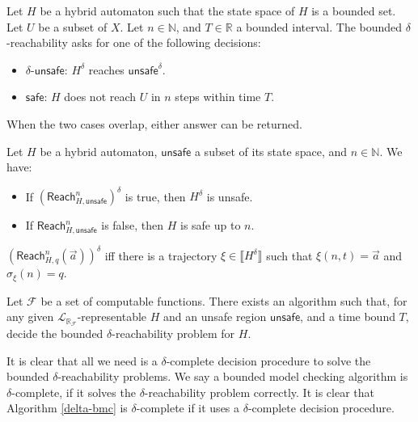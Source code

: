 \documentclass[envcountsect]{llncs}
\newcommand{\reach}{\mathsf{Reach}}
\newcommand{\unsafe}{\mathsf{unsafe}}
\newcommand{\safe}{\mathsf{safe}}
\newcommand{\lrf}{\mathcal{L}_{\mathbb{R}_{\mathcal{F}}}}
\begin{document}
\begin{definition}
Let $H$ be a hybrid automaton such that the state space of $H$ is a bounded
set. Let $U$ be a subset of $X$. Let $n\in \mathbb{N}$, and $T\in \mathbb{R}$ a
bounded interval. The bounded $\delta$-reachability asks for one of the
following decisions:
\begin{itemize}
\item $\delta$-$\unsafe$: $H^{\delta}$ reaches $\unsafe^{\delta}$.
\item $\safe$: $H$ does not reach $U$ in $n$ steps within time $T$.
\end{itemize}
When the two cases overlap, either answer can be returned.
\end{definition}

\begin{lemma}\label{bmclemma}
Let $H$ be a hybrid automaton, $\unsafe$ a subset of its state space, and
$n\in\mathbb{N}$. We have:
\begin{itemize}
\item If $(\reach^n_{H,\unsafe})^{\delta}$ is true, then $H^{\delta}$ is unsafe.
\item If $\reach^n_{H,\unsafe}$ is false, then $H$ is safe up to $n$.
\end{itemize}
\end{lemma}

\begin{proposition}\label{equiv-delta}
$(\reach_{H,q}^n(\vec a))^{\delta}$ iff there is a trajectory $\xi\in
\llbracket H^{\delta}\rrbracket$ such that $\xi(n, t) = \vec a$ and
$\sigma_{\xi}(n) = q$.
\end{proposition}

\begin{theorem}
Let $\mathcal{F}$ be a set of computable functions. There exists an algorithm
such that, for any given $\lrf$-representable $H$ and an unsafe region
$\unsafe$, and a time bound $T$, decide the bounded $\delta$-reachability
problem for $H$.
\end{theorem}
It is clear that all we need is a $\delta$-complete decision procedure to solve
the bounded $\delta$-reachability problems. We say a bounded model checking
algorithm is $\delta$-complete, if it solves the $\delta$-reachability problem
correctly. It is clear that Algorithm \ref{delta-bmc} is $\delta$-complete if it
uses a $\delta$-complete decision procedure.
\end{document}
